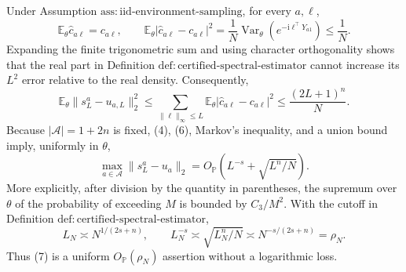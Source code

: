 Under Assumption \(\mathrm{ass:iid\text{-}environment\text{-}sampling}\), for every \(a,\ell\),
\[
 \mathbb E_\theta\widehat c_{a\ell}=c_{a\ell},
 \qquad
 \mathbb E_\theta|\widehat c_{a\ell}-c_{a\ell}|^2
 =\frac1N\operatorname{Var}_\theta(e^{-\mathrm i\ell^\top Y_{a1}})
 \leq\frac1N.
\tag{5}
\]
Expanding the finite trigonometric sum and using character orthogonality shows that the real part in Definition \(\mathrm{def:certified\text{-}spectral\text{-}estimator}\) cannot increase its \(L^2\) error relative to the real density.  Consequently,
\[
 \mathbb E_\theta\lVert s_L^a-u_{a,L}\rVert_2^2
 \leq\sum_{\lVert\ell\rVert_\infty\leq L}
       \mathbb E_\theta|\widehat c_{a\ell}-c_{a\ell}|^2
 \leq\frac{(2L+1)^n}{N}.
\tag{6}
\]
Because \(|\mathcal A|=1+2n\) is fixed, (4), (6), Markov's inequality, and a union bound imply, uniformly in \(\theta\),
\[
 \max_{a\in\mathcal A}\lVert s_L^a-u_a\rVert_2
 =O_{\mathbb P}\!\left(L^{-s}+\sqrt{L^n/N}\right).
\tag{7}
\]
More explicitly, after division by the quantity in parentheses, the supremum over \(\theta\) of the probability of exceeding \(M\) is bounded by \(C_3/M^2\).  With the cutoff in Definition \(\mathrm{def:certified\text{-}spectral\text{-}estimator}\),
\[
 L_N\asymp N^{1/(2s+n)},
 \qquad
 L_N^{-s}\asymp\sqrt{L_N^n/N}
 \asymp N^{-s/(2s+n)}=\rho_N.
\tag{8}
\]
Thus (7) is a uniform \(O_{\mathbb P}(\rho_N)\) assertion without a logarithmic loss.

